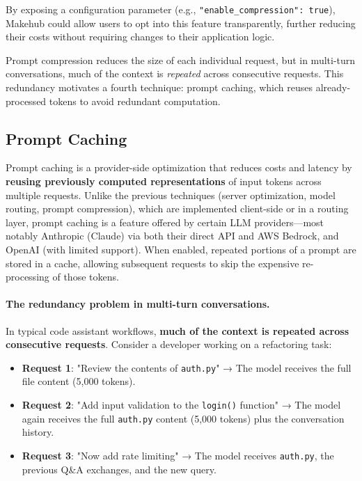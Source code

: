 \documentclass[english]{article}
\begin{document}
By exposing a configuration parameter (e.g., \texttt{"enable\_compression": true}), Makehub could allow users to opt into this feature transparently, further reducing their costs without requiring changes to their application logic.

Prompt compression reduces the size of each individual request, but in multi-turn conversations, much of the context is \emph{repeated} across consecutive requests. This redundancy motivates a fourth technique: prompt caching, which reuses already-processed tokens to avoid redundant computation.

\subsection{Prompt Caching}

Prompt caching is a provider-side optimization that reduces costs and latency by \textbf{reusing previously computed representations} of input tokens across multiple requests. Unlike the previous techniques (server optimization, model routing, prompt compression), which are implemented client-side or in a routing layer, prompt caching is a feature offered by certain LLM providers—most notably Anthropic (Claude) via both their direct API and AWS Bedrock, and OpenAI (with limited support). When enabled, repeated portions of a prompt are stored in a cache, allowing subsequent requests to skip the expensive re-processing of those tokens.

\paragraph{The redundancy problem in multi-turn conversations.}

In typical code assistant workflows, \textbf{much of the context is repeated across consecutive requests}. Consider a developer working on a refactoring task:
\begin{itemize}
    \item \textbf{Request 1}: "Review the contents of \texttt{auth.py}" → The model receives the full file content (5,000 tokens).
    \item \textbf{Request 2}: "Add input validation to the \texttt{login()} function" → The model again receives the full \texttt{auth.py} content (5,000 tokens) plus the conversation history.
    \item \textbf{Request 3}: "Now add rate limiting" → The model receives \texttt{auth.py}, the previous Q\&A exchanges, and the new query.
\end{itemize}
\end{document}
